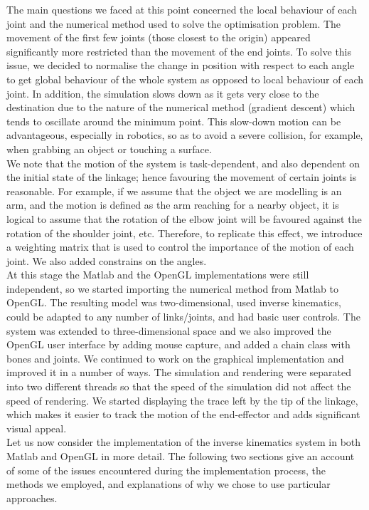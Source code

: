 \documentclass[paper=a4, fontsize=11pt]{scrartcl} %
\numberwithin{equation}{section} %
\numberwithin{figure}{section} %
\numberwithin{table}{section} %
\begin{document}
The main questions we faced at this point concerned the local behaviour of each joint and the numerical method used to solve the optimisation problem. The movement of the first few joints (those closest to the origin) appeared significantly more restricted than the movement of the end joints. To solve this issue, we decided to normalise the change in position with respect to each angle to get global behaviour of the whole system as opposed to local behaviour of each joint. In addition, the simulation slows down as it gets very close to the destination due to the nature of the numerical method (gradient descent) which tends to oscillate around the minimum point. This slow-down motion can be advantageous, especially in robotics, so as to avoid a severe collision, for example, when grabbing an object or touching a surface. \\

We note that the motion of the system is task-dependent, and also dependent on the initial state of the linkage; hence favouring the movement of certain joints is reasonable. For example, if we assume that the object we are modelling is an arm, and the motion is defined as the arm reaching for a nearby object, it is logical to assume that the rotation of the elbow joint will be favoured against the rotation of the shoulder joint, etc. Therefore, to replicate this effect, we introduce a weighting matrix that is used to control the importance of the motion of each joint. We also added constrains on the angles.\\

At this stage the Matlab and the OpenGL implementations were still independent, so we started importing the numerical method from Matlab to OpenGL. The resulting model was two-dimensional, used inverse kinematics, could be adapted to any number of links/joints, and had basic user controls. The system was extended to three-dimensional space and we also improved the OpenGL user interface by adding mouse capture, and added a chain class with bones and joints. We continued to work on the graphical implementation and improved it in a number of ways. The simulation and rendering were separated into two different threads so that the speed of the simulation did not affect the speed of rendering. We started displaying the trace left by the tip of the linkage, which makes it easier to track the motion of the end-effector and adds significant visual appeal. \\

Let us now consider the implementation of the inverse kinematics system in both Matlab and OpenGL in more detail. The following two sections give an account of some of the issues encountered during the implementation process, the methods we employed, and explanations of why we chose to use particular approaches.
\end{document}
